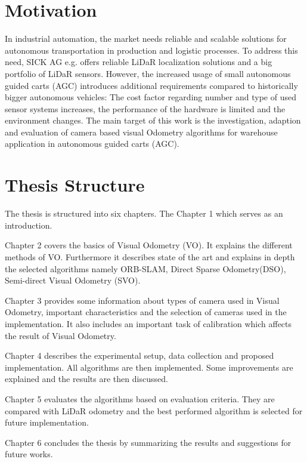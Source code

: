 \section{Motivation}
In industrial automation, the market needs reliable and scalable solutions for autonomous transportation in production and logistic processes. To address this need, SICK AG e.g. offers reliable LiDaR localization solutions and a big portfolio of LiDaR sensors. However, the increased usage of small autonomous guided carts (AGC) introduces additional requirements compared to historically bigger autonomous vehicles: The cost factor regarding number and type of used sensor systems increases, the performance of the hardware is limited
and the environment changes. The main target of this work is the investigation, adaption and evaluation of camera based visual Odometry algorithms for warehouse application in autonomous guided carts (AGC).

\section{Thesis Structure}

The thesis is structured into six chapters. The Chapter 1 which serves as an introduction.

Chapter 2 covers the basics of Visual Odometry (VO). It explains the different methods of VO. Furthermore it describes state of the art and explains in depth the selected  algorithms namely ORB-SLAM, Direct Sparse Odometry(DSO), Semi-direct Visual Odometry (SVO).  

Chapter 3 provides some information about types of camera used in Visual Odometry, important characteristics and the selection of cameras used in the implementation. It also includes an important task of calibration which affects the result of Visual Odometry.

Chapter 4 describes the experimental setup, data collection and proposed implementation. All algorithms are then implemented. Some improvements are explained and the results are then discussed.

Chapter 5 evaluates the algorithms based on evaluation criteria. They are compared with LiDaR odometry and the best performed algorithm is selected for future implementation.

Chapter 6 concludes the thesis by summarizing the results and suggestions for future works.